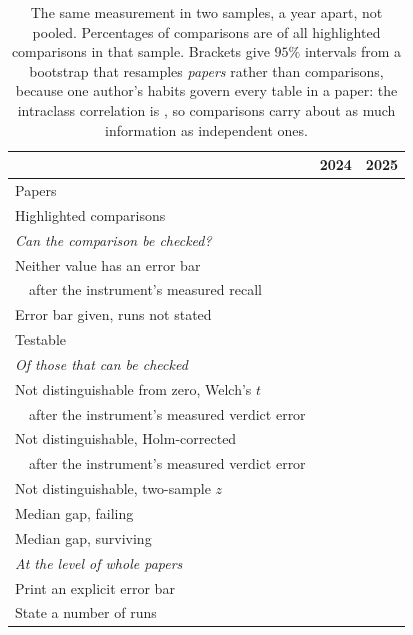 \documentclass{article}
\begin{document}
\begin{table}[t]
\centering
\caption{The same measurement in two samples, a year apart, not pooled.
Percentages of comparisons are of all highlighted comparisons in that sample.
Brackets give $95\%$ intervals from a bootstrap that resamples \emph{papers}
rather than comparisons, because one author's habits govern every table in a
paper: the intraclass correlation is \nIcc{}, so \nNTestable{} comparisons
carry about as much information as \nNEffective{} independent ones.}
\label{tab:main}
\small
\begin{tabular}{lrr}
\toprule
& \textbf{2024} & \textbf{2025} \\
\midrule
Papers & \nPapersTwentyFour{} & \nPapersTwentyFive{} \\
Highlighted comparisons & \nComparisonsTwentyFour{} & \nComparisonsTwentyFive{} \\
\midrule
\multicolumn{3}{l}{\emph{Can the comparison be checked?}} \\
\quad Neither value has an error bar & \nCiNeitherSideTwentyFour{} & \nCiNeitherSide{} \\
\quad \ \ after the instrument's measured recall & & \nHeadlineWithComparisonAudit{} \\
\quad Error bar given, runs not stated & \nPctNoNStatedTwentyFour{} & \nPctNoNStated{} \\
\quad Testable & \nCiTestableTwentyFour{} & \nCiTestable{} \\
\midrule
\multicolumn{3}{l}{\emph{Of those that can be checked}} \\
\quad Not distinguishable from zero, Welch's $t$ & \nCiFailTwentyFour{} & \nCiFail{} \\
\quad \ \ after the instrument's measured verdict error & & \nFailInstrumentBand{} \\
\quad Not distinguishable, Holm-corrected & \nCiFailHolmTwentyFour{} & \nCiFailHolm{} \\
\quad \ \ after the instrument's measured verdict error & & \nFailHolmInstrumentBand{} \\
\quad Not distinguishable, two-sample $z$ & \nFailZTwentyFour{} & \nFailZ{} \\
\quad Median gap, failing & \nGapFailingTwentyFour{} & \nGapFailing{} \\
\quad Median gap, surviving & \nGapPassingTwentyFour{} & \nGapPassing{} \\
\midrule
\multicolumn{3}{l}{\emph{At the level of whole papers}} \\
\quad Print an explicit error bar & \nPctWithErrorBarTwentyFour{} & \nPctWithErrorBar{} \\
\quad State a number of runs & \nPctStatingNTwentyFour{} & \nPctStatingN{} \\
\bottomrule
\end{tabular}
\end{table}
\end{document}
